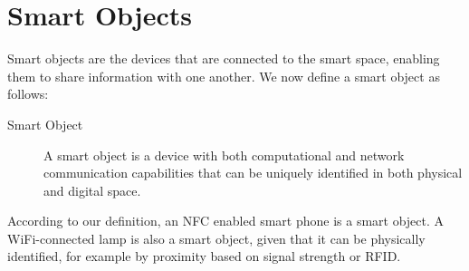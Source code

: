 %
%




\section{Smart Objects}

Smart objects are the devices that are connected to the smart space, enabling them to share information with one another. We now define a smart object as follows:

\begin{description}
	\item[Smart Object]A smart object is a device with both computational and network communication capabilities that can be uniquely identified in both physical and digital space.
\end{description}

According to our definition, an \ac{NFC} enabled smart phone is a smart object. A WiFi-connected lamp is also a smart object, given that it can be physically identified, for example by proximity based on signal strength or \ac{RFID}. 

